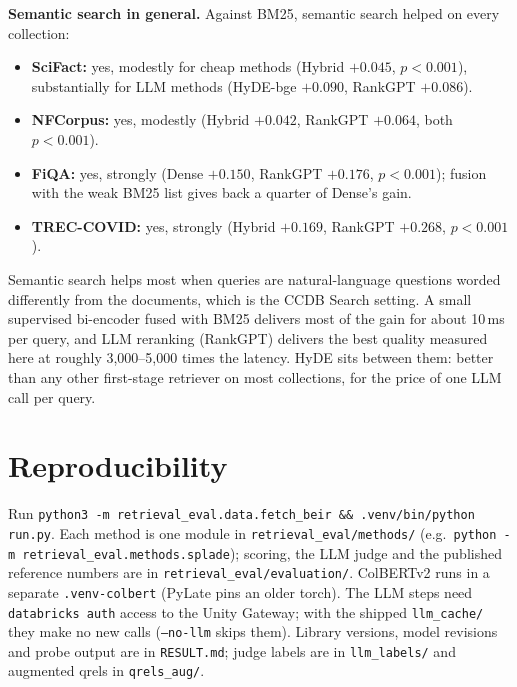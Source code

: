 \documentclass[11pt]{article}
\begin{document}
\textbf{Semantic search in general.} Against BM25, semantic search helped on every collection:
\begin{itemize}
\item \textbf{SciFact:} yes, modestly for cheap methods (Hybrid $+0.045$, $p<0.001$), substantially for
  LLM methods (HyDE-bge $+0.090$, RankGPT $+0.086$).
\item \textbf{NFCorpus:} yes, modestly (Hybrid $+0.042$, RankGPT $+0.064$, both $p<0.001$).
\item \textbf{FiQA:} yes, strongly (Dense $+0.150$, RankGPT $+0.176$, $p<0.001$); fusion with the weak
  BM25 list gives back a quarter of Dense's gain.
\item \textbf{TREC-COVID:} yes, strongly (Hybrid $+0.169$, RankGPT $+0.268$, $p<0.001$).
\end{itemize}
Semantic search helps most when queries are natural-language questions worded differently from the
documents, which is the CCDB Search setting. A small supervised bi-encoder fused with BM25 delivers
most of the gain for about 10\,ms per query, and LLM reranking (RankGPT) delivers the best quality
measured here at roughly 3,000--5,000 times the latency. HyDE sits between them: better than any
other first-stage retriever on most collections, for the price of one LLM call per query.




\appendix
\section{Reproducibility}\sloppy
Run \texttt{python3 -m retrieval\_eval.data.fetch\_beir \&\& .venv/bin/python run.py}. Each method is one module in \texttt{retrieval\_eval/methods/} (e.g.\ \texttt{python -m retrieval\_eval.methods.splade}); scoring, the LLM judge and the published reference numbers are in \texttt{retrieval\_eval/evaluation/}. ColBERTv2 runs in a
separate \texttt{.venv-colbert} (PyLate pins an older torch). The LLM steps need
\texttt{databricks auth} access to the Unity Gateway; with the shipped \texttt{llm\_cache/} they make
no new calls (\texttt{--no-llm} skips them). Library versions, model revisions and probe output are in
\texttt{RESULT.md}; judge labels are in \texttt{llm\_labels/} and augmented qrels in \texttt{qrels\_aug/}.
\end{document}
